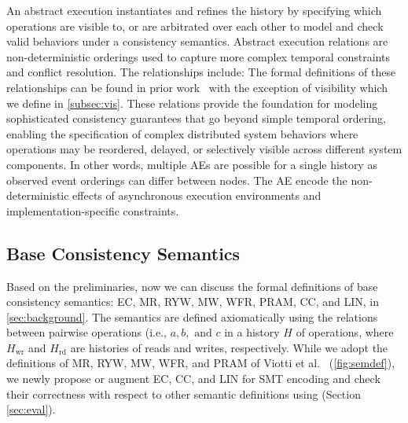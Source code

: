 An abstract execution instantiates and refines the history by
specifying which operations are visible to, or are arbitrated over
each other to model and check valid behaviors under a consistency semantics.
Abstract execution relations are non-deterministic
orderings used to capture more complex temporal constraints and
conflict resolution. The relationships include:
The formal definitions of these relationships can be found in prior
work~\cite{burckhardt2014principles,viotti2016consistency}
with the exception of visibility which we define in \cref{subsec:vis}.
These relations provide the foundation
for modeling sophisticated consistency guarantees that go beyond
simple temporal ordering, enabling the specification of complex
distributed system behaviors where operations may be reordered,
delayed, or selectively visible across different system components.
In other words, multiple AEs are possible for a
single history as observed event orderings can differ between nodes.
The AE encode the non-deterministic effects of asynchronous execution
environments and implementation-specific constraints.

\subsection{Base Consistency Semantics}
\label{subsec:semdef}
Based on the preliminaries, now we can discuss the formal definitions of
base consistency semantics: EC, MR, RYW, MW, WFR, PRAM, CC, and LIN, in
\cref{sec:background}.
The semantics are defined axiomatically using the relations between
pairwise operations (i.e., $a, b, \textrm{ and } c$ in a history $H$ of
  operations, where $H_\text{wr}$ and $H_\text{rd}$ are histories of reads and
  writes, respectively.
  While we adopt the definitions of MR, RYW, MW, WFR,
  and PRAM of Viotti et al.~\cite{viotti2016consistency} (\cref{fig:semdef}),
  we newly propose or augment EC, CC, and LIN for SMT encoding and
  check their correctness with respect to other semantic definitions
  using \sysname{}
  (Section \ref{sec:eval}).

